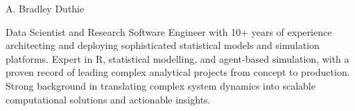\documentclass[letterpaper]{article}
\def\name{A. Bradley Duthie}
\begin{document}
{\Huge \name}

\hrulefill

\vspace{0.03in}

Data Scientist and Research Software Engineer with 10+ years of experience architecting and deploying sophisticated statistical models and simulation platforms. Expert in R, statistical modelling, and agent-based simulation, with a proven record of leading complex analytical projects from concept to production. Strong background in translating complex system dynamics into scalable computational solutions and actionable insights.

\hrulefill

\vspace{0.16in}

\begin{minipage}{0.65\linewidth}

\end{minipage}
\end{document}
